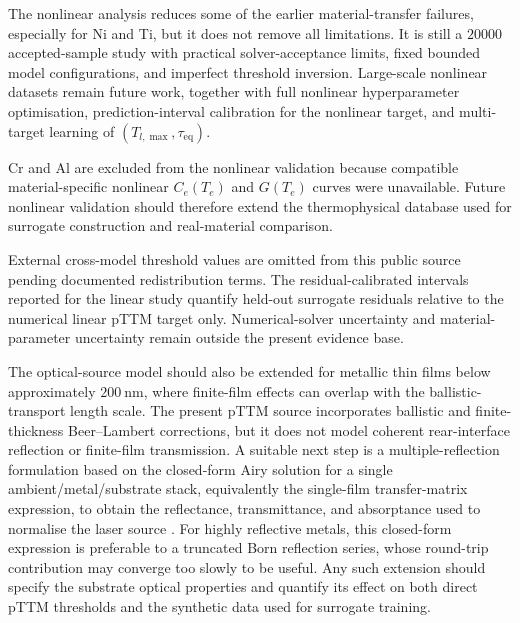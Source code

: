 The nonlinear analysis reduces some of the earlier material-transfer failures, especially for Ni and Ti, but it does not remove all limitations. It is still a \(\num{20000}\) accepted-sample study with practical solver-acceptance limits, fixed bounded model configurations, and imperfect threshold inversion. Large-scale nonlinear datasets remain future work, together with full nonlinear hyperparameter optimisation, prediction-interval calibration for the nonlinear target, and multi-target learning of \((T_{l,\max},\tau_{\mathrm{eq}})\).

Cr and Al are excluded from the nonlinear validation because compatible material-specific nonlinear \(C_e(T_e)\) and \(G(T_e)\) curves were unavailable. Future nonlinear validation should therefore extend the thermophysical database used for surrogate construction and real-material comparison.

External cross-model threshold values are omitted from this public source pending documented redistribution terms. The residual-calibrated intervals reported for the linear study quantify held-out surrogate residuals relative to the numerical linear pTTM target only. Numerical-solver uncertainty and material-parameter uncertainty remain outside the present evidence base.

The optical-source model should also be extended for metallic thin films below approximately \(\SI{200}{\nano\metre}\), where finite-film effects can overlap with the ballistic-transport length scale. The present pTTM source incorporates ballistic and finite-thickness Beer--Lambert corrections, but it does not model coherent rear-interface reflection or finite-film transmission. A suitable next step is a multiple-reflection formulation based on the closed-form Airy solution for a single ambient/metal/substrate stack, equivalently the single-film transfer-matrix expression, to obtain the reflectance, transmittance, and absorptance used to normalise the laser source \cite{Tsibidis_Mansour_Stratakis_2022}. For highly reflective metals, this closed-form expression is preferable to a truncated Born reflection series, whose round-trip contribution may converge too slowly to be useful. Any such extension should specify the substrate optical properties and quantify its effect on both direct pTTM thresholds and the synthetic data used for surrogate training.
